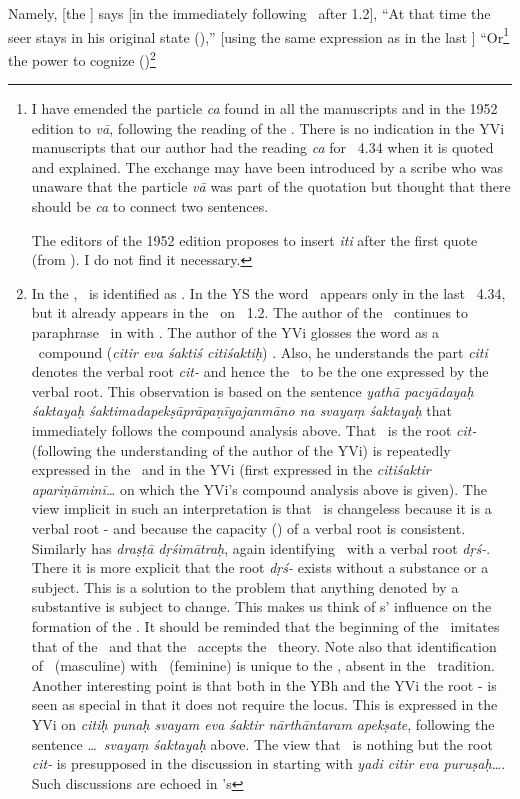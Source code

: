 Namely,%
 [the \Sutrakara] says [in the immediately following \sutra\ after 1.2], ``At that time the seer stays in his original state (),''  [using the same expression as in the last \sutra] ``Or\footnote{I have emended the particle \emph{ca} found in all the manuscripts and in the 1952 edition to \emph{vā}, following the reading of the \sutra.  There is no indication in the YVi manuscripts that our author had the reading \emph{ca} for \sutra\ 4.34 when it is quoted and explained.  The exchange may have been introduced by a scribe who was unaware that the particle \emph{vā} was part of the quotation but thought that there should be \emph{ca} to connect two sentences.

The editors of the 1952 edition proposes to insert \emph{iti} after the first quote (from ).  I do not find it necessary.} the power to cognize (\citisakti)\footnote{In the \PYS, \purusa\ is identified as \citisakti.  In the YS the word \citisakti\ appears only in the last \sutra\ 4.34, but it already appears in the \bhasya\ on \sutra\ 1.2.  The author of the \bhasya\ continues to paraphrase \drastr\ in  with \citisakti.  The author of the YVi glosses the word as a \KD\ compound (\emph{citir eva śaktiś citiśaktiḥ}) \citep[11,26]{yvi}.  Also, he understands the part \emph{citi} denotes the verbal root \emph{cit-} and hence the \sakti\ to be the one expressed by the verbal root.  This observation is based on the sentence \emph{yathā pacyādayaḥ śaktayaḥ śaktimadapekṣāprāpaṇīyajanmāno na svayaṃ śaktayaḥ} that immediately follows the compound analysis above.  That \purusa\ is the root \emph{cit-} (following the understanding of the author of the YVi) is repeatedly expressed in the \YBh\ and in the YVi (first expressed in the  \emph{citiśaktir apariṇāminī\ldots} on which the YVi's compound analysis above is given).  The view implicit in such an interpretation is that \purusa\ is changeless because it is a verbal root \cit- and because the capacity (\sakti) of a verbal root is consistent.  Similarly  has \emph{draṣṭā dṛśimātraḥ}, again identifying \purusa\ with a verbal root \emph{dṛś-}.  There it is more explicit that the root \emph{dṛś-} exists without a substance or a subject.  This is a solution to the problem that anything denoted by a substantive is subject to change.  This makes us think of s' influence on the formation of the \PYS.  It should be reminded that the beginning of the \PYS\ imitates that of the \VMBh\ and that the \PYS\ accepts the \sphota\ theory.  Note also that identification of \purusa\ (masculine) with \citisakti\ (feminine) is unique to the \PYS, absent in the \Samkhya\ tradition.  Another interesting point is that both in the YBh and the YVi the root \cit- is seen as special in that it does not require the locus. This is expressed in the YVi on  \emph{citiḥ punaḥ svayam eva śaktir nārthāntaram apekṣate}, following the sentence \ldots\ \emph{svayaṃ śaktayaḥ} above.  The view that \purusa\ is nothing but the root \emph{cit-} is presupposed in the discussion in  starting with \emph{yadi citir eva puruṣaḥ\ldots}.  Such discussions are echoed in \Sankara's }
